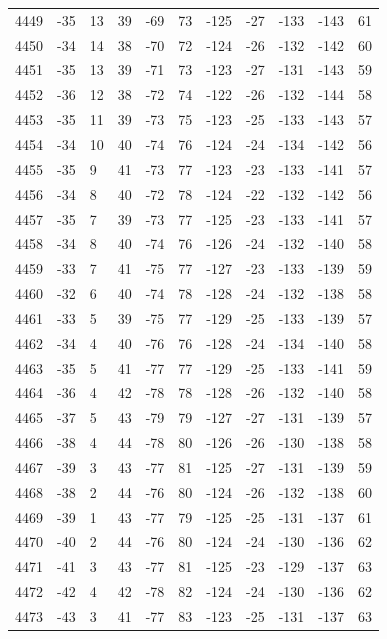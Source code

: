 \begin{table}[H]
\begin{tabular}{lllllllllll}
4449 & -35 & 13 & 39 & -69 & 73 & -125 & -27 & -133 & -143 & 61 \\
4450 & -34 & 14 & 38 & -70 & 72 & -124 & -26 & -132 & -142 & 60 \\
4451 & -35 & 13 & 39 & -71 & 73 & -123 & -27 & -131 & -143 & 59 \\
4452 & -36 & 12 & 38 & -72 & 74 & -122 & -26 & -132 & -144 & 58 \\
4453 & -35 & 11 & 39 & -73 & 75 & -123 & -25 & -133 & -143 & 57 \\
4454 & -34 & 10 & 40 & -74 & 76 & -124 & -24 & -134 & -142 & 56 \\
4455 & -35 & 9 & 41 & -73 & 77 & -123 & -23 & -133 & -141 & 57 \\
4456 & -34 & 8 & 40 & -72 & 78 & -124 & -22 & -132 & -142 & 56 \\
4457 & -35 & 7 & 39 & -73 & 77 & -125 & -23 & -133 & -141 & 57 \\
4458 & -34 & 8 & 40 & -74 & 76 & -126 & -24 & -132 & -140 & 58 \\
4459 & -33 & 7 & 41 & -75 & 77 & -127 & -23 & -133 & -139 & 59 \\
4460 & -32 & 6 & 40 & -74 & 78 & -128 & -24 & -132 & -138 & 58 \\
4461 & -33 & 5 & 39 & -75 & 77 & -129 & -25 & -133 & -139 & 57 \\
4462 & -34 & 4 & 40 & -76 & 76 & -128 & -24 & -134 & -140 & 58 \\
4463 & -35 & 5 & 41 & -77 & 77 & -129 & -25 & -133 & -141 & 59 \\
4464 & -36 & 4 & 42 & -78 & 78 & -128 & -26 & -132 & -140 & 58 \\
4465 & -37 & 5 & 43 & -79 & 79 & -127 & -27 & -131 & -139 & 57 \\
4466 & -38 & 4 & 44 & -78 & 80 & -126 & -26 & -130 & -138 & 58 \\
4467 & -39 & 3 & 43 & -77 & 81 & -125 & -27 & -131 & -139 & 59 \\
4468 & -38 & 2 & 44 & -76 & 80 & -124 & -26 & -132 & -138 & 60 \\
4469 & -39 & 1 & 43 & -77 & 79 & -125 & -25 & -131 & -137 & 61 \\
4470 & -40 & 2 & 44 & -76 & 80 & -124 & -24 & -130 & -136 & 62 \\
4471 & -41 & 3 & 43 & -77 & 81 & -125 & -23 & -129 & -137 & 63 \\
4472 & -42 & 4 & 42 & -78 & 82 & -124 & -24 & -130 & -136 & 62 \\
4473 & -43 & 3 & 41 & -77 & 83 & -123 & -25 & -131 & -137 & 63 \\

\end{tabular}
\end{table}
